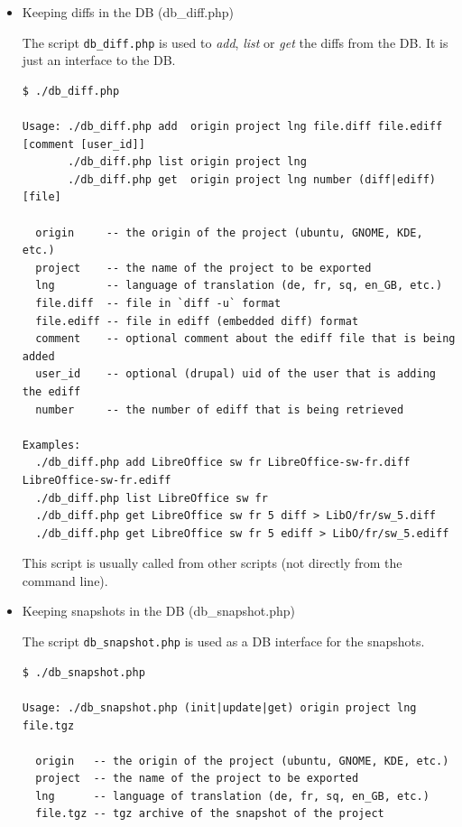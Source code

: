 \documentclass[11pt]{article}
\begin{document}
\begin{itemize}

\item Keeping diffs in the DB (db\_{}diff.php)\\
\label{sec-8.4.4.1}


     The script \texttt{db\_diff.php} is used to \emph{add}, \emph{list} or \emph{get} the diffs
     from the DB. It is just an interface to the DB.


\begin{verbatim}
$ ./db_diff.php

Usage: ./db_diff.php add  origin project lng file.diff file.ediff [comment [user_id]]
       ./db_diff.php list origin project lng
       ./db_diff.php get  origin project lng number (diff|ediff) [file]

  origin     -- the origin of the project (ubuntu, GNOME, KDE, etc.)
  project    -- the name of the project to be exported
  lng        -- language of translation (de, fr, sq, en_GB, etc.)
  file.diff  -- file in `diff -u` format
  file.ediff -- file in ediff (embedded diff) format
  comment    -- optional comment about the ediff file that is being added
  user_id    -- optional (drupal) uid of the user that is adding the ediff
  number     -- the number of ediff that is being retrieved

Examples:
  ./db_diff.php add LibreOffice sw fr LibreOffice-sw-fr.diff LibreOffice-sw-fr.ediff
  ./db_diff.php list LibreOffice sw fr
  ./db_diff.php get LibreOffice sw fr 5 diff > LibO/fr/sw_5.diff
  ./db_diff.php get LibreOffice sw fr 5 ediff > LibO/fr/sw_5.ediff
\end{verbatim}



     This script is usually called from other scripts (not directly from
     the command line).



\item Keeping snapshots in the DB (db\_{}snapshot.php)\\
\label{sec-8.4.4.2}


     The script \texttt{db\_snapshot.php} is used as a DB interface for the snapshots.


\begin{verbatim}
$ ./db_snapshot.php

Usage: ./db_snapshot.php (init|update|get) origin project lng file.tgz

  origin   -- the origin of the project (ubuntu, GNOME, KDE, etc.)
  project  -- the name of the project to be exported
  lng      -- language of translation (de, fr, sq, en_GB, etc.)
  file.tgz -- tgz archive of the snapshot of the project


\end{verbatim}
\end{itemize}
\end{document}
